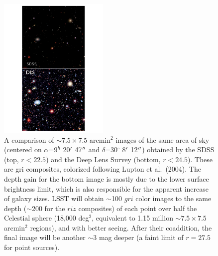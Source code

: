 \begin{figure}
\begin{center}
\includegraphics[width=0.47\textwidth,clip]{panels1_2.pdf}
\end{center}
\caption{A comparison of $\sim7.5\times7.5$ arcmin$^2$ images of
the same area of sky (centered on $\alpha$=9$^h$ 20$\mbox{$^\prime$}$ 47$\mbox{$^{\prime\prime}$}$ and
$\delta$=30$^\circ$ 8$\mbox{$^\prime$}$ 12$\mbox{$^{\prime\prime}$}$) obtained by the SDSS (top, $r<22.5$) and
the Deep Lens Survey (bottom, $r<24.5$). These are gri composites,
colorized following Lupton et al.~(2004).  The depth gain for the bottom image
is mostly due to the lower surface brightness limit, which is also responsible
for the apparent increase of galaxy sizes. LSST will obtain $\sim$100 $gri$
color images to the same depth ($\sim$200 for the $riz$ composites) of each point
over half the Celestial sphere (18,000 deg$^2$, equivalent to 1.15 million $\sim7.5\times7.5$
arcmin$^2$ regions), and with better seeing. After their coaddition, the final
image will be another $\sim3$ mag deeper (a faint limit of $r=27.5$ for point
sources).}
\label{Fig:panels1}
\end{figure}

